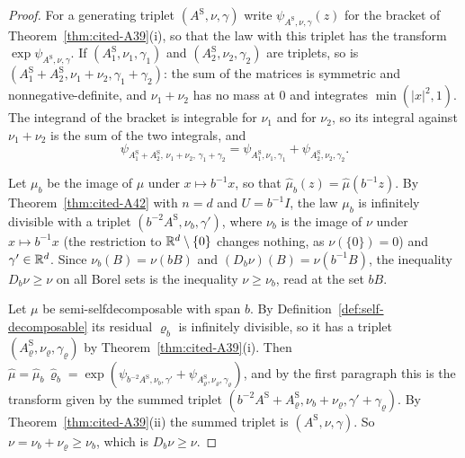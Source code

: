\begin{proof}
For a generating triplet $(A^{\mathrm S}, \nu, \gamma)$ write $\psi_{A^{\mathrm S},\nu,\gamma}(z)$ for the bracket of
Theorem~\ref{thm:cited-A39}(i), so that the law with this triplet has the transform
$\exp\psi_{A^{\mathrm S},\nu,\gamma}$. If $(A^{\mathrm S}_1, \nu_1, \gamma_1)$ and
$(A^{\mathrm S}_2, \nu_2, \gamma_2)$ are triplets, so is
$(A^{\mathrm S}_1 + A^{\mathrm S}_2, \nu_1 + \nu_2, \gamma_1 + \gamma_2)$: the sum of the matrices is symmetric and
nonnegative-definite, and $\nu_1 + \nu_2$ has no mass at $0$ and integrates $\min(|x|^2, 1)$. The
integrand of the bracket is integrable for $\nu_1$ and for $\nu_2$, so its integral against
$\nu_1 + \nu_2$ is the sum of the two integrals, and
\[
  \psi_{A^{\mathrm S}_1 + A^{\mathrm S}_2,\,\nu_1 + \nu_2,\,\gamma_1 + \gamma_2}
  = \psi_{A^{\mathrm S}_1,\nu_1,\gamma_1} + \psi_{A^{\mathrm S}_2,\nu_2,\gamma_2}.
\]

Let $\mu_b$ be the image of $\mu$ under $x \mapsto b^{-1}x$, so that
$\widehat\mu_b(z) = \widehat\mu(b^{-1}z)$. By Theorem~\ref{thm:cited-A42} with $n = d$ and $U = b^{-1}I$,
the law $\mu_b$ is infinitely divisible with a triplet $(b^{-2}A^{\mathrm S}, \nu_b, \gamma')$, where $\nu_b$
is the image of $\nu$ under $x \mapsto b^{-1}x$ (the restriction to $\mathbb{R}^d \setminus \{0\}$ changes
nothing, as $\nu(\{0\}) = 0$) and $\gamma' \in \mathbb{R}^d$. Since $\nu_b(B) = \nu(bB)$ and
$(D_b\nu)(B) = \nu(b^{-1}B)$, the inequality $D_b\nu \ge \nu$ on all Borel sets is the inequality
$\nu \ge \nu_b$, read at the set $bB$.

Let $\mu$ be semi-selfdecomposable with span $b$. By Definition~\ref{def:self-decomposable} its
residual $\varrho_b$ is infinitely divisible, so it has a triplet
$(A^{\mathrm S}_\varrho, \nu_\varrho, \gamma_\varrho)$ by
Theorem~\ref{thm:cited-A39}(i). Then
$\widehat\mu = \widehat\mu_b\,\widehat\varrho_b = \exp(\psi_{b^{-2}A^{\mathrm S},\nu_b,\gamma'} +
\psi_{A^{\mathrm S}_\varrho,\nu_\varrho,\gamma_\varrho})$, and by the first paragraph this is the transform given by the
summed triplet $(b^{-2}A^{\mathrm S} + A^{\mathrm S}_\varrho, \nu_b + \nu_\varrho, \gamma' + \gamma_\varrho)$. By
Theorem~\ref{thm:cited-A39}(ii) the summed triplet is $(A^{\mathrm S}, \nu, \gamma)$. So
$\nu = \nu_b + \nu_\varrho \ge \nu_b$, which is $D_b\nu \ge \nu$.


\end{proof}
